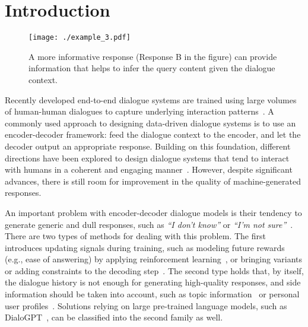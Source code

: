 \documentclass[sigconf]{acmart}
\begin{document}


\maketitle

% 
% 
% 
% 
% 
% 

\section{Introduction}
\label{sec:introduction}
\begin{figure}[t]
\centering
   \texttt{[image: ./example\_3.pdf]}
   \caption{A more informative response (Response B in the figure) can provide information that helps to infer the query content given the dialogue context.}
   \vspace{-0.5 cm}
   \label{fig:back-reasoning}
\end{figure}

Recently developed end-to-end dialogue systems are trained using large volumes of human-human dialogues to capture  underlying interaction patterns~\citep{li2015diversity,li2017adversarial,xing2017topic,khatri2018advancing,vinyals2015neural,zhang2019dialogpt,bao2019plato}. A commonly used approach to designing data-driven dialogue systems is to use an encoder-decoder framework: feed the dialogue context to the encoder, and let the decoder output an appropriate response. Building on this foundation, different directions have been explored to design dialogue systems that tend to interact with humans in a coherent and engaging manner~\citep{li2016deep,li2019dialogue,wiseman2016sequence,baheti2018generating,xing2016topic,zhang2018personalizing}. However, despite significant advances, there is still room for improvement in the quality of machine-generated responses.  


An important problem with encoder-decoder dialogue models is their tendency to generate generic and dull responses, such as \emph{``I don't know''} or \emph{``I'm not sure''}~\citep{li2015diversity,baheti2018generating,li2016deep,jiang-why-2018}. 
There are two types of methods for dealing with this problem.
The first introduces updating signals during training, such as modeling future rewards (e.g., ease of answering) by applying reinforcement learning~\citep{li2016deep,li2019dialogue}, or bringing variants or adding constraints to the decoding step~\citep{wiseman2016sequence,li2015diversity,baheti2018generating}. 
The second type holds that, by itself, the dialogue history is not enough for generating high-quality responses, and side information should be taken into account, such as topic information~\citep{xing2016topic,xing2017topic} or personal user profiles~\citep{zhang2018personalizing}. Solutions relying on large pre-trained language models, such as DialoGPT~\citep{zhang2019dialogpt}, can be classified into the second family as well.
\end{document}
